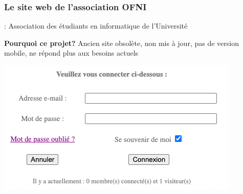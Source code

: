 \begin{frame}
    \frametitle{Le site web de l’association OFNI}
    \centering
    \vspace{0.4cm}
    \ofni : Association des étudiants en informatique de l’Université
    \vspace{0.7cm}

    \pause
    
    \textbf{Pourquoi ce projet?} Ancien site obsolète, non mis à jour, pas de version mobile, ne répond plus aux besoins actuels
    \vspace{0.4cm}

    \includegraphics[height=0.35\textwidth]{pictures/img-old-site.png}
\end{frame}
